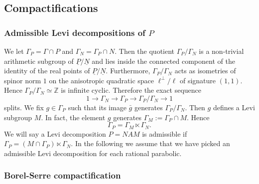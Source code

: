 \documentclass[12pt,leqno]{amsart}
\numberwithin{equation}{section}
\theoremstyle{plain}
\theoremstyle{definition}
\theoremstyle{remark}
\newcommand{\Z}{\mathbb{Z}}
\newcommand{\G}{\Gamma}
\begin{document}
\subsection{Compactifications}



\subsubsection{Admissible Levi decompositions of $P$}

We let $\G_P = \G \cap P$ and $\G_N = \G_P \cap N$. Then the quotient $\G_P/\G_N$ is a non-trivial arithmetic subgroup of $\underline{P}/\underline{N}$ and lies inside the connected component of the identity of the real points of $\underline{P}/\underline{N}$. Furthermore, $\G_P/\G_N$ acts as isometries of spinor norm $1$ on the anisotropic quadratic space $\ell^{\perp}/\ell$  of signature $(1,1)$. Hence $\G_P/\G_N \simeq \Z$ is infinite cyclic. Therefore the exact sequence 
\begin{equation*} \label{exactsequence}
1 \to \G_N \to \G_P \to \G_P/\G_N \to 1
\end{equation*}
splits. We fix $g \in \G_P$ such that its image $\bar{g}$ generates $\G_P/\G_N$. Then $g$ defines a Levi subgroup $M$. In fact, the element $g$ generates $\G_M :=\G_P \cap M$. Hence
\[
\G_P = \G_M \ltimes \G_N.
\]
We will say a Levi decomposition $P = NAM$ is admissible if $
\G_P = (M \cap \G_P) \ltimes \G_N$. In the following we assume that we have picked an admissible Levi decomposition for each rational parabolic.
  

\subsubsection{Borel-Serre compactification}\label{BScomp}
\end{document}
